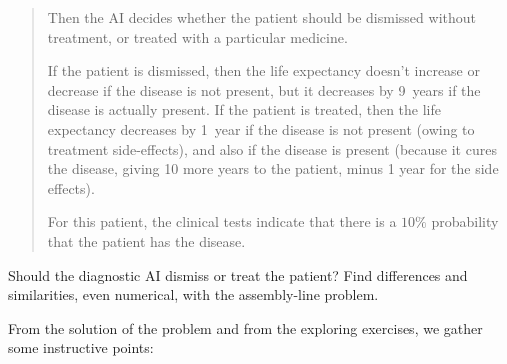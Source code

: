 \documentclass[
  a4paper,
  DIV=11,
  numbers=noendperiod,
  oneside]{scrreprt}
\begin{document}
\begin{tcolorbox}
\begin{enumerate}
\begin{quote}
  Then the AI decides whether the patient should be dismissed without
  treatment, or treated with a particular medicine.

  If the patient is dismissed, then the life expectancy doesn't increase
  or decrease if the disease is not present, but it decreases by 9~years
  if the disease is actually present. If the patient is treated, then
  the life expectancy decreases by 1~year if the disease is not present
  (owing to treatment side-effects), and also if the disease is present
  (because it cures the disease, giving 10 more years to the patient,
  minus 1 year for the side effects).

  For this patient, the clinical tests indicate that there is a \(10\%\)
  probability that the patient has the disease.
  \end{quote}

  Should the diagnostic AI dismiss or treat the patient? Find
  differences and similarities, even numerical, with the assembly-line
  problem.
\end{enumerate}

\end{tcolorbox}

\hfill\break

From the solution of the problem and from the exploring exercises, we
gather some instructive points:
\end{document}
